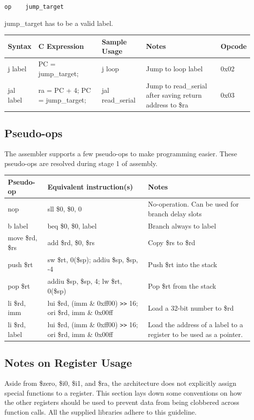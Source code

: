 \documentclass{article}
\begin{document}
\begin{verbatim}
op    jump_target
\end{verbatim}

jump\_target has to be a valid label. 

\begin{tabular}{| l | l | l | p{5cm} | l |}
\hline
Syntax & C Expression & Sample Usage & Notes & Opcode \\
\hline
j label & PC = jump\_target; & j loop & Jump to loop label & 0x02 \\
jal label & ra = PC + 4; PC = jump\_target; & jal read\_serial & Jump to read\_serial after saving return address to \$ra & 0x03 \\
\hline
\end{tabular}

\subsection{Pseudo-ops}
The assembler supports a few pseudo-ops to make programming easier. These pseudo-ops are resolved during stage 1 of assembly.

\begin{tabular}{| l | l | p{6cm} |}
\hline
Pseudo-op  &  Equivalent instruction(s)  &  Notes \\
\hline
nop & sll \$0, \$0, 0 & No-operation. Can be used for branch delay slots \\
b label & beq \$0, \$0, label & Branch always to label \\
move \$rd, \$rs & add \$rd, \$0, \$rs & Copy \$rs to \$rd \\
push \$rt & sw \$rt, 0(\$sp); addiu \$sp, \$sp, -4 & Push \$rt into the stack \\
pop \$rt & addiu \$sp, \$sp, 4; lw \$rt, 0(\$sp) & Pop \$rt from the stack \\
li \$rd, imm & lui \$rd, (imm \& 0xff00) \verb+>>+ 16; ori \$rd, imm \& 0x00ff & Load a 32-bit number to \$rd \\
li \$rd, label & lui \$rd, (imm \& 0xff00) \verb+>>+ 16; ori \$rd, imm \& 0x00ff & Load the address of a label to a register to be used as a pointer. \\
\hline
\end{tabular}

\subsection{Notes on Register Usage}
Aside from \$zero, \$i0, \$i1, and \$ra, the architecture does not explicitly assign special functions to a register. This section lays down some conventions on how the other registers should be used to prevent data from being clobbered across function calls. All the supplied libraries adhere to this guideline. 
\end{document}
